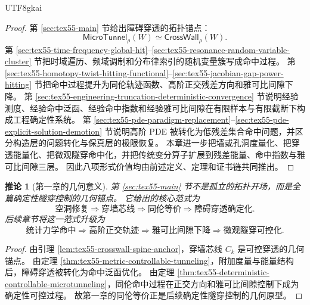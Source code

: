 \documentclass[12pt]{article}
\newtheorem{corollary}{推论}[section]
\newcommand{\MicroTunnel}{\mathsf{MicroTunnel}}
\newcommand{\CrossWall}{\mathsf{CrossWall}}
\begin{document}
\begin{CJK*}{UTF8}{gkai}
\begin{proof}
第 \ref{sec:tex55-main} 节给出障碍穿透的拓扑锚点：
\[
  \MicroTunnel_\rho(W)\simeq\CrossWall_\rho(W).
\]
第 \ref{sec:tex55-time-frequency-global-hit}--\ref{sec:tex55-resonance-random-variable-cluster} 节把时域遍历、频域调制和分布律索引的随机变量簇写成命中过程。
第 \ref{sec:tex55-homotopy-twist-hitting-functional}--\ref{sec:tex55-jacobian-gap-power-hitting} 节把命中过程提升为同伦轨迹函数、高阶正交残差方向和雅可比间隙下降。
第 \ref{sec:tex55-engineering-truncation-deterministic-convergence} 节说明经验测度、经验命中泛函、经验命中指数和经验雅可比间隙在有限样本与有限截断下构成工程确定性系统。
第 \ref{sec:tex55-pde-paradigm-replacement}--\ref{sec:tex55-pde-explicit-solution-demotion} 节说明高阶 PDE 被转化为低残差集合命中问题，并区分构造层的问题转化与保真层的极限恢复。
本章进一步把墙或孔洞度量化、把穿透能量化、把微观隧穿命中化，并把传统变分算子扩展到残差能量、命中指数与雅可比间隙三层。
因此八项形式价值均由前述定义、定理和证书链共同推出。
\end{proof}

\begin{corollary}[第一章的几何意义]
\label{cor:tex55-first-section-geometric-meaning}
第 \ref{sec:tex55-main} 节不是孤立的拓扑开场，而是全篇确定性隧穿控制的几何锚点。
它给出的核心范式为
\[
  \boxed{
  \text{空洞修复}
  \Rightarrow
  \text{穿墙芯线}
  \Rightarrow
  \text{同伦等价}
  \Rightarrow
  \text{障碍穿透确定化}.
  }
\]
后续章节将这一范式升级为
\[
  \boxed{
  \text{统计力学命中}
  \Rightarrow
  \text{高阶正交轨迹}
  \Rightarrow
  \text{雅可比间隙下降}
  \Rightarrow
  \text{微观隧穿可控化}.
  }
\]
\end{corollary}

\begin{proof}
由引理 \ref{lem:tex55-crosswall-spine-anchor}，穿墙芯线 \(C_k\) 是可控穿透的几何锚点。
由定理 \ref{thm:tex55-metric-controllable-tunneling}，附加度量与能量结构后，障碍穿透被转化为命中泛函优化。
由定理 \ref{thm:tex55-deterministic-controllable-microtunneling}，同伦命中过程在正交方向和雅可比间隙控制下成为确定性可控过程。
故第一章的同伦等价正是后续确定性隧穿控制的几何原型。
\end{proof}


\end{CJK*}
\end{document}

